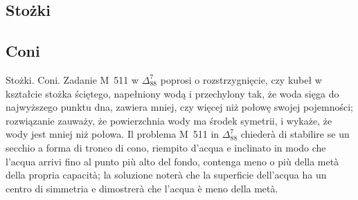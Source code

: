 %

\subsection{Stożki} %
\subsection{Coni} %
Stożki. %
Coni. %
Zadanie M~511 w $\Delta_{88}^{7}$ poprosi o rozstrzygnięcie, czy kubeł w kształcie stożka ściętego, napełniony wodą i przechylony tak, że woda sięga do najwyższego punktu dna, zawiera mniej, czy więcej niż połowę swojej pojemności; rozwiązanie zauważy, że powierzchnia wody ma środek symetrii, i wykaże, że wody jest mniej niż połowa. %
Il problema M~511 in $\Delta_{88}^{7}$ chiederà di stabilire se un secchio a forma di tronco di cono, riempito d'acqua e inclinato in modo che l'acqua arrivi fino al punto più alto del fondo, contenga meno o più della metà della propria capacità; la soluzione noterà che la superficie dell'acqua ha un centro di simmetria e dimostrerà che l'acqua è meno della metà. %

%